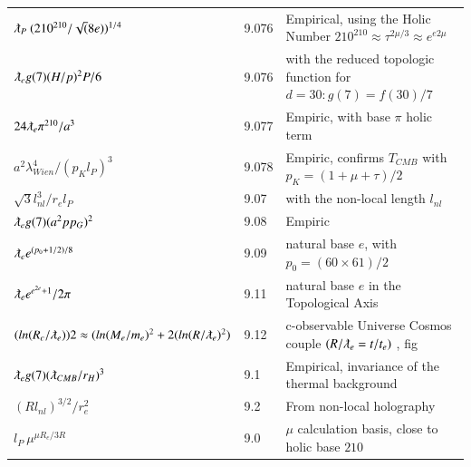 \documentclass[a4paper,9pt]{article}
\begin{document}
\begin{table}
\begin{tabular}{lll}
   
   $  \lambdabar_P ~ (210^{210}/\sqrt(8e))^{1/4}$  & 9.076 & Empirical, using the Holic Number $210^{210}\approx \tau^{2\mu/3}\approx e^{e2\mu}$  \\
   
    
   $ \lambdabar_eg(7) (H/p)^2  P/6 $ & 9.076 & with the reduced topologic function for $d = 30: g(7) = f(30)/7$ \cite{Sanchez2}  \\
   
    
    $ 24 \lambdabar_e  \pi^{210}/a^3 $ & 9.077 & Empiric, with base $\pi$ holic term \\
    
    $ a^2 \lambda_{Wien}^4/(p_Kl_P)^3 $ & 9.078 & Empiric, confirms $T_{CMB}$ with $p_K = (1+\mu +\tau)/2$ \cite{Koide} \\

    
    
  
  $ \sqrt 3l_{nl}^3/r_el_P $ & 9.07 & with the non-local length $l_{nl}$  \\
  
  $ \lambdabar_e g(7) (a^2pp_G)^2 $ & 9.08 & Empiric \cite{Sanchez2}  \\
  
  $ \lambdabar_e e^{(p_0+1/2)/8} $ & 9.09 & natural base $e$, with $p_0 = (60 \times 61)/2$ \\
  
  
  
  $ \lambdabar_e e^{e^{2e}+1}/2\pi $ & 9.11 & natural base $e$ in the Topological Axis\\
  
 $ (ln(R_c/\lambdabar_e)) 2 \approx (ln(M_e/m_e)^2 + 2(ln(R/\lambdabar_e)^2) $ & 9.12 & c-observable Universe  Cosmos couple $(R/\lambdabar_e = t/t_e)$ , fig    \\
 
  
  
  
  
  
 $ \lambdabar_e g(7) (\lambdabar_{CMB}/r_H)^3 $ & 9.1 & Empirical, invariance of the thermal background \cite{Sanchez2}  \\
 
 $  (Rl_{nl})^{3/2}/r_e^2 $ & 9.2 & From non-local holography \cite{Sanchez2}  \\
 
  $  l_P ~ \mu^{\mu R_e/3R}  $ & 9.0 & $\mu$ calculation basis, close to holic base $210$   \\
  
  
  
  
 
 \bottomrule
  \end{tabular}
\end{table} 
  
\end{document}
